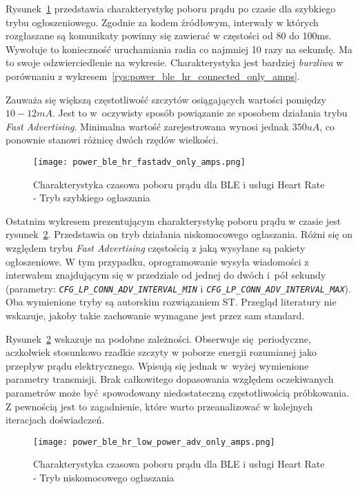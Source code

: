 Rysunek~\ref{rys:power_ble_hr_fastadv_only_amps} przedstawia charakterystykę poboru prądu po czasie
dla szybkiego trybu ogłoszeniowego. Zgodnie za kodem źródłowym, interwały w których rozgłaszane
są komunikaty powinny się zawierać w częstości od 80 do 100ms. Wywołuje to konieczność uruchamiania radia
co najmniej 10 razy na sekundę. Ma to swoje odzwierciedlenie na wykresie. Charakterystyka jest bardziej
\textit{burzliwa} w porównaniu z wykresem~\ref{rys:power_ble_hr_connected_only_amps}. 

Zauważa się większą częstotliwość szczytów osiągających wartości pomiędzy $10-12mA$. Jest to w~oczywisty
sposób powiązanie ze sposobem działania trybu \textit{Fast Advertising}. Minimalna wartość zarejestrowana wynosi jednak
$350uA$, co ponownie stanowi różnicę dwóch rzędów wielkości.

\begin{figure}[!ht]
	\centering \texttt{[image: power\_ble\_hr\_fastadv\_only\_amps.png]}
	\caption{Charakterystyka czasowa poboru prądu dla BLE i usługi Heart Rate - Tryb szybkiego ogłaszania}
	\label{rys:power_ble_hr_fastadv_only_amps}
\end{figure}

Ostatnim wykresem prezentującym charakterystykę poboru prądu w czasie jest rysunek~\ref{rys:power_ble_hr_low_power_adv_only_amps}.
Przedstawia on tryb działania niskomocowego ogłaszania. Różni się on względem trybu \textit{Fast Advertising} częstością z jaką wysyłane
są pakiety ogłoszeniowe. W tym przypadku, oprogramowanie wysyła wiadomości z interwałem znajdującym się w przedziale od 
jednej do dwóch i~pół sekundy (parametry: \textit{\texttt{CFG\_LP\_CONN\_ADV\_INTERVAL\_MIN}} i \textit{\texttt{CFG\_LP\_CONN\_ADV\_INTERVAL\_MAX}}). 
Oba wymienione tryby są autorskim rozwiązaniem ST. Przegląd literatury nie wskazuje, jakoby takie zachowanie wymagane
jest przez sam standard.

Rysunek~\ref{rys:power_ble_hr_low_power_adv_only_amps} wskazuje na podobne zależności. Obserwuje się periodyczne, aczkolwiek
stosunkowo rzadkie szczyty w poborze energii rozumianej jako przepływ prądu elektrycznego. Wpisują się jednak w~wyżej wymienione
parametry transmisji. Brak całkowitego dopasowania względem oczekiwanych parametrów może być spowodowany niedostateczną
częstotliwością próbkowania. Z pewnością jest to zagadnienie, które warto przeanalizować w kolejnych iteracjach doświadczeń.


\begin{figure}[!ht]
	\centering \texttt{[image: power\_ble\_hr\_low\_power\_adv\_only\_amps.png]}
	\caption{Charakterystyka czasowa poboru prądu dla BLE i usługi Heart Rate - Tryb niskomocowego ogłaszania}
	\label{rys:power_ble_hr_low_power_adv_only_amps}
\end{figure}

